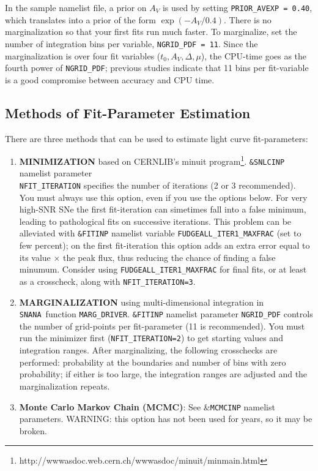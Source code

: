 \documentclass[12pt]{article}
\newcommand{\snana}{{\tt SNANA}}
\newcommand{\wwwMINUIT}{http://wwwasdoc.web.cern.ch/wwwasdoc/minuit/minmain.html}
\newcommand{\minuit}{{\sc minuit}}
\begin{document}
In the sample namelist file, a prior on $A_V$ is used by
setting {\tt PRIOR\_AVEXP = 0.40}, which translates into
a prior of the form $\exp(-A_V/0.4)$.
There is no marginalization so that your first fits run much faster.
To marginalize, set the number of integration bins per variable,
{\tt NGRID\_PDF~=~11}.
Since the marginalization is over four fit variables
($t_0,A_V,\Delta,\mu$),
the  CPU-time goes as the fourth power of {\tt NGRID\_PDF}; 
previous studies indicate that 11 bins per fit-variable 
is a good compromise between accuracy and CPU time.

   \subsection{Methods of Fit-Parameter Estimation}
   \label{subsec:param_eval}

There are three methods that can be used to estimate
light curve fit-parameters: 
%
\begin{enumerate} 
 \item {\bf MINIMIZATION} based on CERNLIB's 
   {\minuit} program\footnote{\wwwMINUIT}.
   {\tt \&SNLCINP} namelist parameter \\ {\tt NFIT\_ITERATION} 
   specifies the number of iterations (2 or 3  recommended).
   You must always use this option, even if you use the 
   options below. For very high-SNR SNe the first fit-iteration
   can simetimes fall into a false minimum, leading to pathological
   fits on successive iterations. This problem can
   be alleviated with {\tt \&FITINP} namelist variable
   {\tt FUDGEALL\_ITER1\_MAXFRAC} (set to few percent);
   on the first fit-iteration this option adds
   an extra error equal to its value $\times$ the peak flux,
   thus reducing the chance of finding a false minumum.
   Consider using {\tt FUDGEALL\_ITER1\_MAXFRAC} for final fits,
   or at least as a crosscheck, 
   along with {\tt NFIT\_ITERATION=3}.   
%
 \item {\bf MARGINALIZATION} using multi-dimensional integration
    in \snana\ function {\tt MARG\_DRIVER}.
   {\tt \&FITINP} namelist parameter {\tt NGRID\_PDF} controls
   the number of grid-points per fit-parameter (11 is recommended).
   You must run the minimizer first ({\tt NFIT\_ITERATION=2})
   to get starting values and integration ranges.
   After marginalizing, the following crosschecks are performed:
   probability at the  boundaries and number of bins with zero 
   probability; if either is too large, the integration ranges
   are adjusted and the marginalization repeats.
%
 \item {\bf Monte Carlo Markov Chain (MCMC)}: 
       See \&{\tt MCMCINP} namelist parameters.
       WARNING: this option has not been used for years, so it
        may be broken.
\end{enumerate} 
\end{document}
